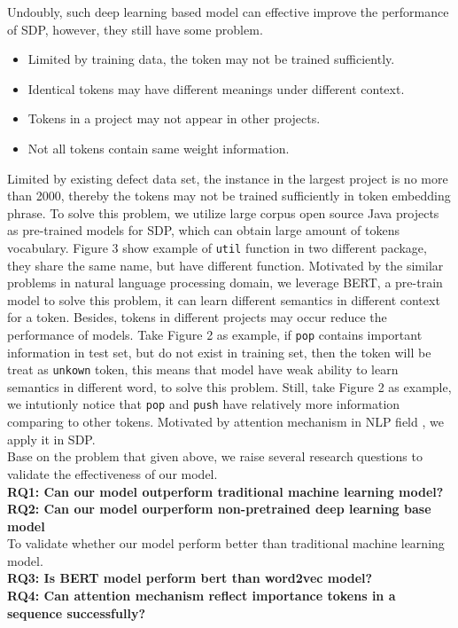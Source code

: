 \documentclass{article}
\begin{document}
Undoubly, such deep learning based model can effective improve the performance of SDP, however, they still have some problem.
\begin{itemize}
    \item Limited by training data, the token may not be trained sufficiently.
    \item Identical tokens may have different meanings under different context.
    \item Tokens in a project may not appear in other projects. 
    \item Not all tokens contain same weight information.
\end{itemize}
Limited by existing defect data set, the instance in the largest project is no more than 2000, thereby the tokens may not be trained sufficiently in token embedding phrase. To solve this problem, we utilize large corpus open source Java projects as pre-trained models for SDP, which can obtain large amount of tokens vocabulary. Figure 3 \cite{} show example of \texttt{util} function in two different package, they share the same name, but have different function. Motivated by the similar problems in natural language processing domain, we leverage BERT, a pre-train model to solve this problem, it can learn different semantics in different context for a token. Besides, tokens in different projects may occur reduce the performance of models. Take Figure 2 \cite{} as example, if \texttt{pop} contains important information in test set, but do not exist in training set, then the token will be treat as \texttt{unkown} token, this means that model have weak ability to learn semantics in different word, to solve this problem. Still, take Figure 2 as example, we intutionly notice that \texttt{pop} and \texttt{push} have relatively more information comparing to other tokens. Motivated by attention mechanism in NLP field \cite{}, we apply it in SDP. \\

Base on the problem that given above, we raise several research questions to validate the effectiveness of our model.\\
\textbf{RQ1: Can our model outperform traditional machine learning model?}\\
\textbf{RQ2: Can our model ourperform non-pretrained deep learning base model}\\
To validate whether our model perform better than traditional machine learning model. \\
\textbf{RQ3: Is BERT model perform bert than word2vec model?}\\
\textbf{RQ4: Can attention mechanism reflect importance tokens in a sequence successfully?}\\
\end{document}
